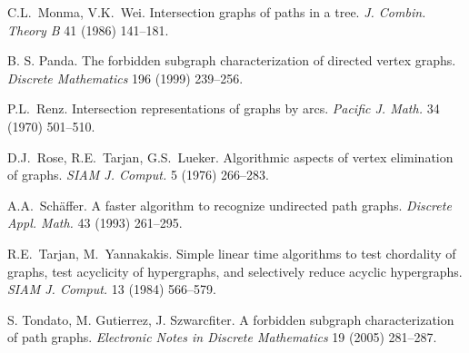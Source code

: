 \documentclass[11pt]{article}
\begin{document}
\begin{thebibliography}{99}
C.L.~Monma, V.K.~Wei.  Intersection graphs of paths in a tree.
\emph{J. Combin.  Theory B} 41 (1986) 141--181.

B. S. Panda.  The forbidden subgraph characterization of directed
vertex graphs.  {\it Discrete Mathematics} 196 (1999) 239--256.

P.L.~Renz.  Intersection representations of graphs by arcs.
\emph{Pacific J. Math.} 34 (1970) 501--510.

D.J.~Rose, R.E.~Tarjan, G.S.~Lueker.  Algorithmic aspects of vertex
elimination of graphs.  \emph{SIAM J. Comput.} 5 (1976) 266--283.



A.A.~Sch\"affer.  A faster algorithm to recognize undirected path
graphs.  \emph{Discrete Appl.  Math.} 43 (1993) 261--295.

R.E.~Tarjan, M.~Yannakakis.  Simple linear time algorithms to test
chordality of graphs, test acyclicity of hypergraphs, and selectively
reduce acyclic hypergraphs.  \emph{SIAM J. Comput.} 13 (1984)
566--579.

S. Tondato, M. Gutierrez, J. Szwarcfiter.  A forbidden subgraph
characterization of path graphs.  {\it Electronic Notes in Discrete
Mathematics} 19 (2005) 281--287.





\end{thebibliography}
\end{document}
